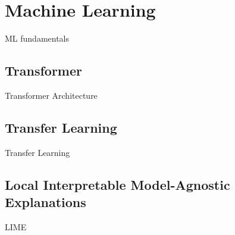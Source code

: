 \section{Machine Learning}
\label{chp:fundamentals:sec:machine_learning}
ML fundamentals

\subsection{Transformer}
\label{chp:fundamentals:sec:machine_learning:subsec:transformer}
Transformer Architecture

\subsection{Transfer Learning}
\label{chp:fundamentals:sec:machine_learning:subsec:transfer_learning}
Transfer Learning

\subsection{Local Interpretable Model-Agnostic Explanations}
\label{chp:fundamentals:sec:machine_learning:subsec:transfer_learning}
\Ac{LIME}
